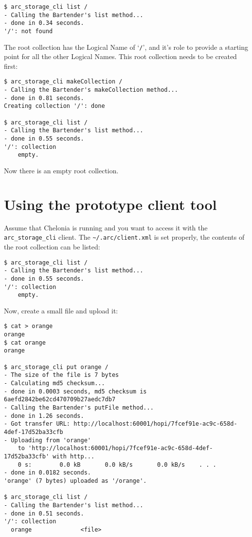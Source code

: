 \documentclass{article}
\begin{document}
\begin{verbatim}
$ arc_storage_cli list /
- Calling the Bartender's list method...
- done in 0.34 seconds.
'/': not found
\end{verbatim}

The root collection has the Logical Name of `\verb!/!', and it's role to provide a starting point for all the other Logical Names. This root collection needs to be created first:

\begin{verbatim}
$ arc_storage_cli makeCollection /
- Calling the Bartender's makeCollection method...
- done in 0.81 seconds.
Creating collection '/': done

$ arc_storage_cli list /
- Calling the Bartender's list method...
- done in 0.55 seconds.
'/': collection
    empty.
\end{verbatim}

Now there is an empty root collection.

\section{Using the prototype client tool} %

Assume that Chelonia is running and you want to access it with the \verb!arc_storage_cli! client. The \verb!~/.arc/client.xml! is set properly, the contents of the root collection can be listed:

\begin{verbatim}
$ arc_storage_cli list /
- Calling the Bartender's list method...
- done in 0.55 seconds.
'/': collection
    empty.
\end{verbatim}

Now, create a small file and upload it:

\begin{verbatim}
$ cat > orange
orange
$ cat orange 
orange

$ arc_storage_cli put orange /
- The size of the file is 7 bytes
- Calculating md5 checksum...
- done in 0.0003 seconds, md5 checksum is 6aefd2842be62cd470709b27aedc7db7
- Calling the Bartender's putFile method...
- done in 1.26 seconds.
- Got transfer URL: http://localhost:60001/hopi/7fcef91e-ac9c-658d-4def-17d52ba33cfb
- Uploading from 'orange'
    to 'http://localhost:60001/hopi/7fcef91e-ac9c-658d-4def-17d52ba33cfb' with http...
    0 s:        0.0 kB       0.0 kB/s       0.0 kB/s    . . .       
- done in 0.0182 seconds.
'orange' (7 bytes) uploaded as '/orange'.

$ arc_storage_cli list /
- Calling the Bartender's list method...
- done in 0.51 seconds.
'/': collection
  orange              <file>

\end{verbatim}
\end{document}
